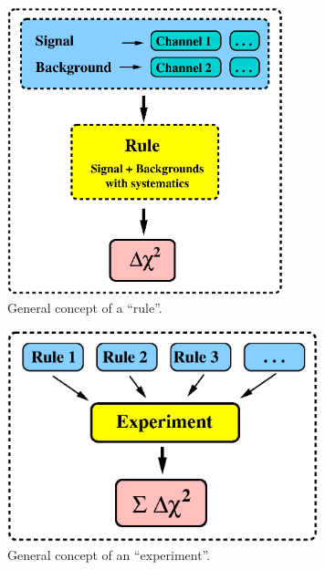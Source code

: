 \begin{figure}[t]
\begin{center}
\includegraphics[width=8cm]{SignalBackground}
\end{center}
\caption{\label{fig:rule} General concept of a ``rule''.}
\end{figure}

\begin{figure}[t]
\begin{center}
\includegraphics[width=9cm]{Rules}
\end{center}
\caption{\label{fig:experiment} General concept of an ``experiment''.}
\end{figure}

